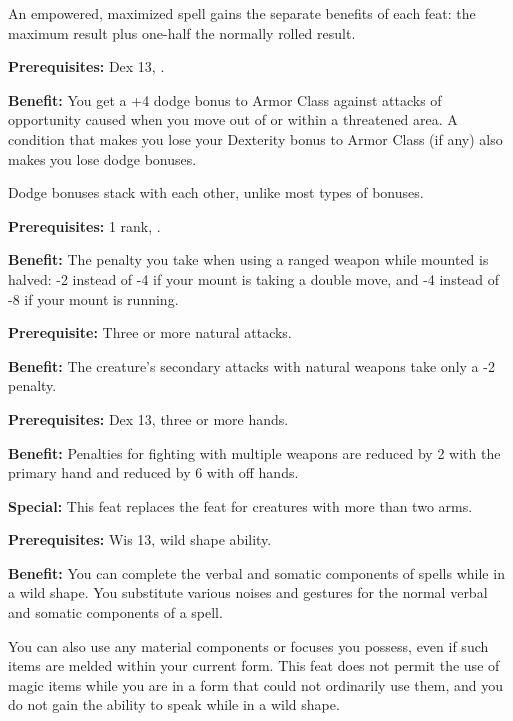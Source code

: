 An empowered, maximized spell gains the separate benefits of each feat: the maximum result plus one-half the normally rolled result.


\textbf{Prerequisites:} Dex 13, .

\textbf{Benefit:} You get a +4 dodge bonus to Armor Class against attacks of opportunity caused when you move out of or within a threatened area. A condition that makes you lose your Dexterity bonus to Armor Class (if any) also makes you lose dodge bonuses.

Dodge bonuses stack with each other, unlike most types of bonuses.


\textbf{Prerequisites:}  1 rank, .

\textbf{Benefit:} The penalty you take when using a ranged weapon while mounted is halved: -2 instead of -4 if your mount is taking a double move, and -4 instead of -8 if your mount is running.


\textbf{Prerequisite:} Three or more natural attacks.

\textbf{Benefit:} The creature's secondary attacks with natural weapons take only a -2 penalty.


\textbf{Prerequisites:} Dex 13, three or more hands.

\textbf{Benefit:} Penalties for fighting with multiple weapons are reduced by 2 with the primary hand and reduced by 6 with off hands.

\textbf{Special:} This feat replaces the  feat for creatures with more than two arms.


\textbf{Prerequisites:} Wis 13, wild shape ability.

\textbf{Benefit:} You can complete the verbal and somatic components of spells while in a wild shape. You substitute various noises and gestures for the normal verbal and somatic components of a spell.

You can also use any material components or focuses you possess, even if such items are melded within your current form. This feat does not permit the use of magic items while you are in a form that could not ordinarily use them, and you do not gain the ability to speak while in a wild shape.

